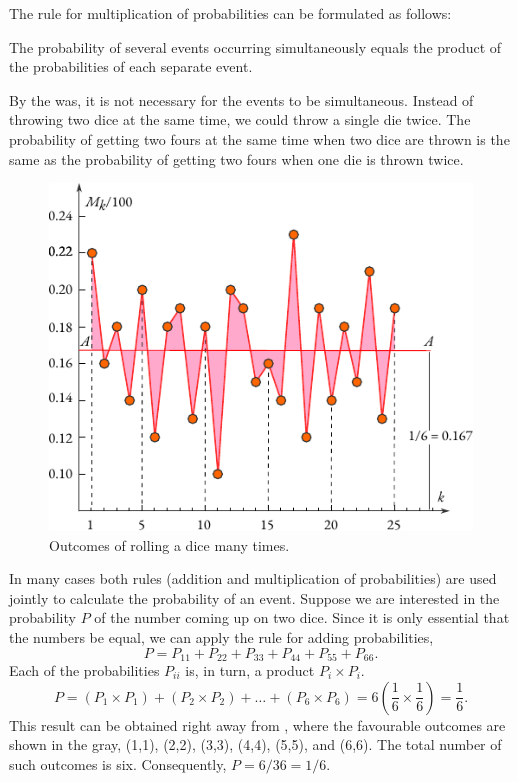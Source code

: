 The rule for multiplication of probabilities can be formulated as
follows:
\begin{mybox}{}
The probability of several events occurring simultaneously equals the product of the probabilities of each separate event.
\end{mybox}
By the was, it is not necessary for the events to be simultaneous. Instead of throwing two dice at the same time, we could throw a
 single die twice. The probability of getting two fours at the same
 time when two dice are thrown is the same as the probability of
 getting two fours when one die is thrown twice.

\begin{figure}
 \centering
 \includegraphics[width=0.9\tfwidth]{figures/die-graph.pdf}
\caption{Outcomes of rolling a dice many times.\label{die-graph}}
\end{figure}
 
 
In many cases both rules (addition and multiplication of
probabilities) are used jointly to calculate the probability of an
event. Suppose we are interested in the probability $P$ of the  number coming up on two dice. Since it is only essential that the numbers be equal, we can apply the rule for adding probabilities,
\begin{equation*}
P = P_{11} + P_{22} + P_{33} + P_{44} + P_{55} + P_{66}.
\end{equation*}
Each of the probabilities $P_{ii}$ is, in turn, a product $P_{i} \times P_{i}$. 
\begin{equation*}
P = (P_{1} \times P_{1}) + (P_{2} \times P_{2}) + \ldots + (P_{6}
\times P_{6}) = 6 \left( \dfrac{1}{6} \times \dfrac{1}{6} \right) = \dfrac{1}{6}.
\end{equation*}
This result can be obtained right away from , where
the favourable outcomes are shown in the gray, (1,1), (2,2), (3,3),
(4,4), (5,5), and (6,6). The total number of such outcomes is six. Consequently, $P = 6/36 = 1/6$.

